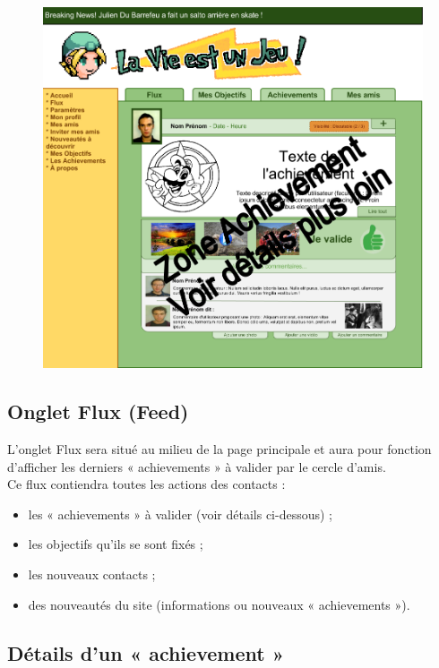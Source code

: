 \documentclass{life-fr}
\begin{document}
\begin{figure}[H]
  \begin{center}
    \includegraphics[width=15cm]{img/accueil.png}
  \end{center}
\end{figure}


\subsection{Onglet Flux (Feed)}

L'onglet Flux sera situé au milieu de la page principale et aura pour fonction d'afficher les derniers « achievements » à valider par le cercle d'amis.\\

Ce flux contiendra toutes les actions des contacts :

\begin{itemize}
  \item les « achievements » à valider (voir détails ci-dessous) ;
  \item les objectifs qu'ils se sont fixés ;
  \item les nouveaux contacts ;
  \item des nouveautés du site (informations ou nouveaux « achievements »).
\end{itemize}

\subsection{Détails d'un « achievement »}
\end{document}
